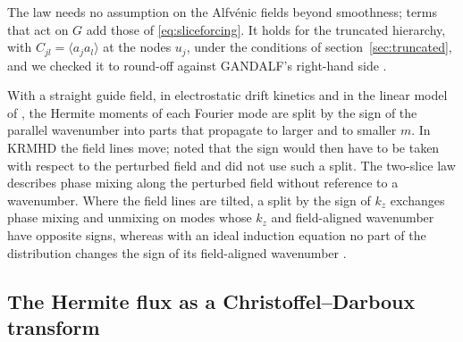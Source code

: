 The law needs no assumption on the Alfv\'enic fields beyond smoothness; terms that act on $G$ add those of \eqref{eq:sliceforcing}. It holds for the truncated hierarchy, with $C_{jl}=\langle a_ja_l\rangle$ at the nodes $u_j$, under the conditions of section~\ref{sec:truncated}, and we checked it to round-off against GANDALF's right-hand side \citep{Kanekar2025}.

With a straight guide field, in electrostatic drift kinetics \citep{Schekochihin2016,Parker2016} and in the linear model of \citet{Kanekar2015}, the Hermite moments of each Fourier mode are split by the sign of the parallel wavenumber into parts that propagate to larger and to smaller $m$. In KRMHD the field lines move; \citet{Meyrand2019} noted that the sign would then have to be taken with respect to the perturbed field and did not use such a split. The two-slice law describes phase mixing along the perturbed field without reference to a wavenumber. Where the field lines are tilted, a split by the sign of $k_z$ exchanges phase mixing and unmixing on modes whose $k_z$ and field-aligned wavenumber have opposite signs, whereas with an ideal induction equation no part of the distribution changes the sign of its field-aligned wavenumber \citep{KanekarPrep}.

\subsection{The Hermite flux as a Christoffel--Darboux transform}\label{dec:sec-flux}


